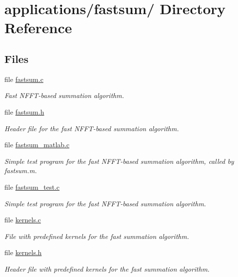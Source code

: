 \hypertarget{dir_000016}{
\section{applications/fastsum/ Directory Reference}
\label{dir_000016}
}
\subsection*{Files}
\begin{CompactItemize}
\item 
file \hyperlink{fastsum_8c}{fastsum.c}
\begin{CompactList}\small\item\em Fast NFFT-based summation algorithm. \item\end{CompactList}

\item 
file \hyperlink{fastsum_8h}{fastsum.h}
\begin{CompactList}\small\item\em Header file for the fast NFFT-based summation algorithm. \item\end{CompactList}

\item 
file \hyperlink{fastsum__matlab_8c}{fastsum\_\-matlab.c}
\begin{CompactList}\small\item\em Simple test program for the fast NFFT-based summation algorithm, called by fastsum.m. \item\end{CompactList}

\item 
file \hyperlink{fastsum__test_8c}{fastsum\_\-test.c}
\begin{CompactList}\small\item\em Simple test program for the fast NFFT-based summation algorithm. \item\end{CompactList}

\item 
file \hyperlink{kernels_8c}{kernels.c}
\begin{CompactList}\small\item\em File with predefined kernels for the fast summation algorithm. \item\end{CompactList}

\item 
file \hyperlink{kernels_8h}{kernels.h}
\begin{CompactList}\small\item\em Header file with predefined kernels for the fast summation algorithm. \item\end{CompactList}

\end{CompactItemize}
